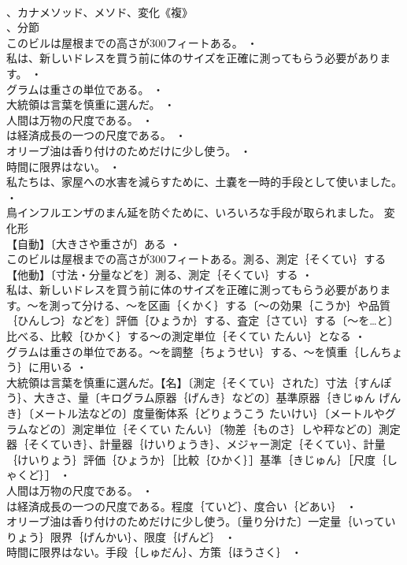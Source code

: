 \documentclass[8pt]{extreport}
\begin{document}
\begin{CJK}{UTF8}{min}
\\	、カナメソッド、メソド、変化《複》
\\	、分節
\\	このビルは屋根までの高さが300フィートある。 ・
\\	私は、新しいドレスを買う前に体のサイズを正確に測ってもらう必要があります。 ・
\\	グラムは重さの単位である。 ・
\\	大統領は言葉を慎重に選んだ。 ・
\\	人間は万物の尺度である。 ・
\\	は経済成長の一つの尺度である。 ・
\\	オリーブ油は香り付けのためだけに少し使う。 ・
\\	時間に限界はない。 ・
\\	私たちは、家屋への水害を減らすために、土嚢を一時的手段として使いました。 ・
\\	鳥インフルエンザのまん延を防ぐために、いろいろな手段が取られました。	変化形 
\\	【自動】〔大きさや重さが〕ある ・
\\	このビルは屋根までの高さが300フィートある。測る、測定｛そくてい｝する【他動】〔寸法・分量などを〕測る、測定｛そくてい｝する ・
\\	私は、新しいドレスを買う前に体のサイズを正確に測ってもらう必要があります。～を測って分ける、～を区画｛くかく｝する〔～の効果｛こうか｝や品質｛ひんしつ｝などを〕評価｛ひょうか｝する、査定｛さてい｝する〔～を…と〕比べる、比較｛ひかく｝する～の測定単位｛そくてい たんい｝となる ・
\\	グラムは重さの単位である。～を調整｛ちょうせい｝する、～を慎重｛しんちょう｝に用いる ・
\\	大統領は言葉を慎重に選んだ。【名】〔測定｛そくてい｝された〕寸法｛すんぽう｝、大きさ、量〔キログラム原器｛げんき｝などの〕基準原器｛きじゅん げんき｝〔メートル法などの〕度量衡体系｛どりょうこう たいけい｝〔メートルやグラムなどの〕測定単位｛そくてい たんい｝〔物差｛ものさ｝しや秤などの〕測定器｛そくていき｝、計量器｛けいりょうき｝、メジャー測定｛そくてい｝、計量｛けいりょう｝評価｛ひょうか｝［比較｛ひかく｝］基準｛きじゅん｝［尺度｛しゃくど｝］ ・
\\	人間は万物の尺度である。 ・
\\	は経済成長の一つの尺度である。程度｛ていど｝、度合い｛どあい｝ ・
\\	オリーブ油は香り付けのためだけに少し使う。〔量り分けた〕一定量｛いっていりょう｝限界｛げんかい｝、限度｛げんど｝ ・
\\	時間に限界はない。手段｛しゅだん｝、方策｛ほうさく｝ ・

\end{CJK}
\end{document}
